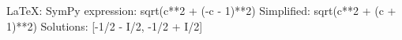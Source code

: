 ﻿LaTeX: 
SymPy expression:
sqrt(c**2 + (-c - 1)**2)
Simplified:
sqrt(c**2 + (c + 1)**2)
Solutions:
[-1/2 - I/2, -1/2 + I/2]
